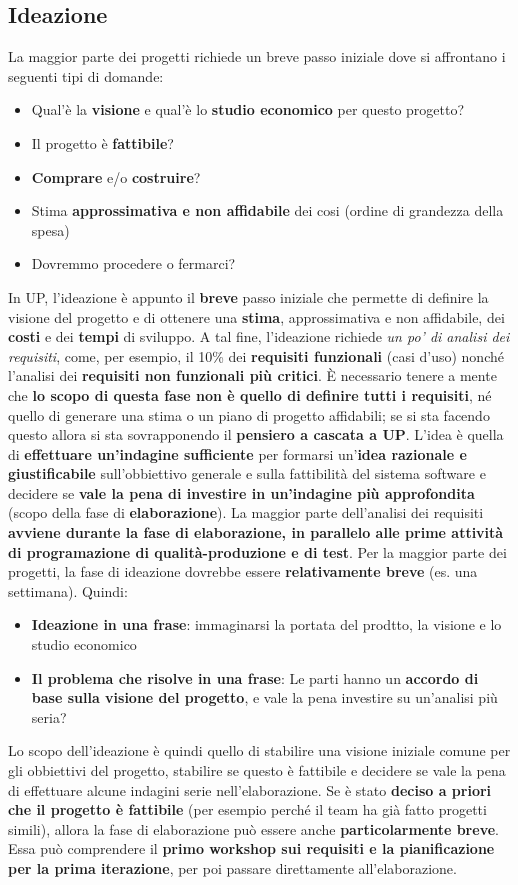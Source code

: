 \documentclass[12pt]{article}
\begin{document}
\subsection{Ideazione}
La maggior parte dei progetti richiede un breve passo iniziale dove si affrontano i seguenti tipi di domande:
\begin{itemize}
    \item Qual'è la \textbf{visione} e qual'è lo \textbf{studio economico} per questo progetto?
    \item Il progetto è \textbf{fattibile}?
    \item \textbf{Comprare} e/o \textbf{costruire}?
    \item Stima \textbf{approssimativa e non affidabile} dei cosi (ordine di grandezza della spesa)
    \item Dovremmo procedere o fermarci?
\end{itemize}
In UP, l'ideazione è appunto il \textbf{breve} passo iniziale che permette di definire la visione del progetto e di ottenere una \textbf{stima}, approssimativa e non affidabile, dei \textbf{costi} e dei \textbf{tempi} di sviluppo.
A tal fine, l'ideazione richiede \textit{un po' di analisi dei requisiti}, come, per esempio, il 10\% dei \textbf{requisiti funzionali} (casi d'uso) nonché l'analisi dei \textbf{requisiti non funzionali più critici}.
È necessario tenere a mente che \textbf{lo scopo di questa fase non è quello di definire tutti i requisiti}, né quello di generare una stima o un piano di progetto affidabili; se si sta facendo questo allora si sta sovrapponendo il \textbf{pensiero a cascata a UP}.
L'idea è quella di \textbf{effettuare un'indagine sufficiente} per formarsi un'\textbf{idea razionale e giustificabile} sull'obbiettivo generale e sulla fattibilità del sistema software e decidere se \textbf{vale la pena di investire in un'indagine più approfondita} (scopo della fase di \textbf{elaborazione}).
La maggior parte dell'analisi dei requisiti \textbf{avviene durante la fase di elaborazione, in parallelo alle prime attività di programazione di qualità-produzione e di test}.
Per la maggior parte dei progetti, la fase di ideazione dovrebbe essere \textbf{relativamente breve} (es. una settimana).
Quindi:
\begin{itemize}
    \item \textbf{Ideazione in una frase}: immaginarsi la portata del prodtto, la visione e lo studio economico
    \item \textbf{Il problema che risolve in una frase}: Le parti hanno un \textbf{accordo di base sulla visione del progetto}, e vale la pena investire su un'analisi più seria?
\end{itemize}
Lo scopo dell'ideazione è quindi quello di stabilire una visione iniziale comune per gli obbiettivi del progetto, stabilire se questo è fattibile e decidere se vale la pena di effettuare alcune indagini serie nell'elaborazione.
Se è stato \textbf{deciso a priori che il progetto è fattibile} (per esempio perché il team ha già fatto progetti simili), allora la fase di elaborazione può essere anche \textbf{particolarmente breve}. 
Essa può comprendere il \textbf{primo workshop sui requisiti e la pianificazione per la prima iterazione}, per poi passare direttamente all'elaborazione.
\end{document}
